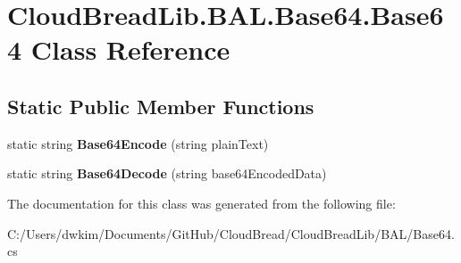 \hypertarget{a00020}{}\section{Cloud\+Bread\+Lib.\+B\+A\+L.\+Base64.\+Base64 Class Reference}
\label{a00020}
\subsection*{Static Public Member Functions}
\begin{DoxyCompactItemize}
\item 
static string {\bfseries Base64\+Encode} (string plain\+Text)\hypertarget{a00020_a901a46986bd2fb9302c4cd728f09c2d4}{}\label{a00020_a901a46986bd2fb9302c4cd728f09c2d4}

\item 
static string {\bfseries Base64\+Decode} (string base64\+Encoded\+Data)\hypertarget{a00020_a56f06fb89cb0b7b03a4818cecc47b3aa}{}\label{a00020_a56f06fb89cb0b7b03a4818cecc47b3aa}

\end{DoxyCompactItemize}


The documentation for this class was generated from the following file\+:\begin{DoxyCompactItemize}
\item 
C\+:/\+Users/dwkim/\+Documents/\+Git\+Hub/\+Cloud\+Bread/\+Cloud\+Bread\+Lib/\+B\+A\+L/Base64.\+cs\end{DoxyCompactItemize}
